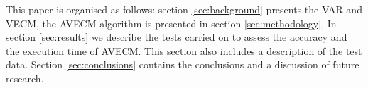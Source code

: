 This paper is organised as follows: section \ref{sec:background} presents the
VAR and VECM, the AVECM algorithm is presented in section \ref{sec:methodology}.
In section \ref{sec:results} we describe the tests carried on to assess the
accuracy and the execution time of AVECM.  This section also includes a
description of the test data.  Section \ref{sec:conclusions} contains the
conclusions and a discussion of future research.
